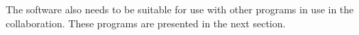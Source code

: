 The software also needs to be suitable for use with other programs in use in the \rtb{} collaboration. These programs are presented in the next section.
%
%
%
%
